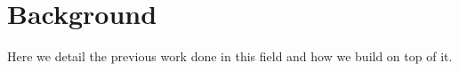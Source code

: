 \section{Background}
\label{sec:background}

Here we detail the previous work done in this field and how we build on top of it. 
